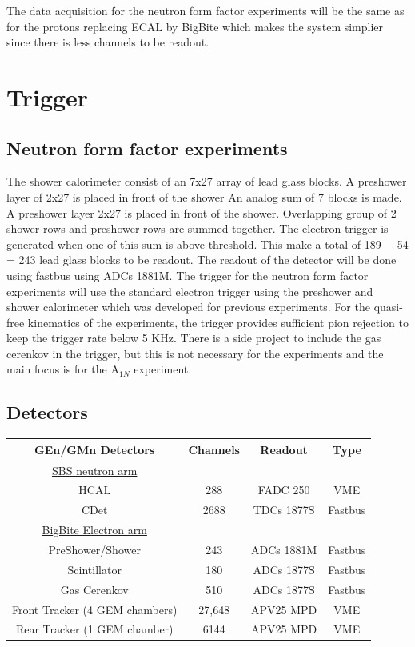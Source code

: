 \documentclass{article}
\begin{document}
The data acquisition for the neutron form factor experiments will be the same as for the protons replacing ECAL by BigBite
which makes the system simplier since there is less channels to be readout.

\section{Trigger}
\subsection{Neutron form factor experiments}
\label{sec:neutron-trig}
The shower calorimeter consist of an 7x27 array of  lead glass blocks. A preshower
 layer of 2x27 is placed in front of the shower
An analog sum of 7 blocks is made. 
A preshower layer 2x27 is placed in front of the shower.
Overlapping group of 2 shower rows and preshower rows are summed together. 
The electron trigger is generated when one of this sum is above threshold.
This make a total of 189 + 54 = 243 lead glass blocks to be readout.
The readout of the detector will be done using fastbus using ADCs 1881M.
 The trigger for the neutron form factor experiments will use the 
standard electron trigger using the preshower and shower calorimeter which was developed for previous experiments. 
For the quasi-free kinematics of the experiments, the trigger provides sufficient pion rejection to keep the
trigger rate below 5 KHz. There is a side project to include the gas cerenkov in the trigger, but this
is not necessary for the experiments and the main focus is for the A$_{1N}$ experiment.



\subsection{Detectors}
\begin{tabular}{|c|c|c|c|}
\hline
\hline
GEn/GMn Detectors & Channels& Readout & Type \\
\hline
\underline{SBS neutron arm} & & & \\
HCAL & 288 & FADC 250 &VME\\
CDet & 2688 & TDCs 1877S&Fastbus\\
\hline
\underline{BigBite Electron arm} & & & \\
PreShower/Shower & 243 & ADCs 1881M&Fastbus\\
Scintillator & 180& ADCs 1877S&Fastbus\\
Gas Cerenkov & 510& ADCs 1877S&Fastbus\\
Front Tracker (4 GEM chambers) & 27,648 & APV25 MPD &VME\\
Rear Tracker (1 GEM chamber) & 6144& APV25 MPD &VME\\
\hline
\end{tabular}
\end{document}
